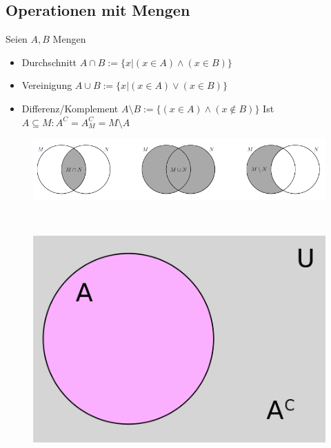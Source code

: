\documentclass{article}
\begin{document}
        \subsection{Operationen mit Mengen}
            Seien $A,B$ Mengen
            \begin{itemize}
                \item Durchschnitt $A\cap B :=\{x|(x\in A)\land (x\in B)\}$
                \item Vereinigung $A\cup B :=\{x|(x\in A)\lor (x\in B)\}$
                \item Differenz/Komplement $A\setminus B :=\{(x\in A)\land (x \notin B)\}$
                \subitem Ist $A\subseteq M: A^C=A^C_M=M\setminus A $
            \end{itemize}
            \begin{figure}[h]
                \centering
                \includegraphics[width=0.75\linewidth]{Vorlesung-2-20231026/Mengen.png}
                \\
            \end{figure}\\
            \begin{figure}[h]
                \centering
                \includegraphics[width=0.25\linewidth]{Vorlesung-2-20231026/Screenshot from 2023-10-26 12-00-55.png}
            \end{figure}
\end{document}
